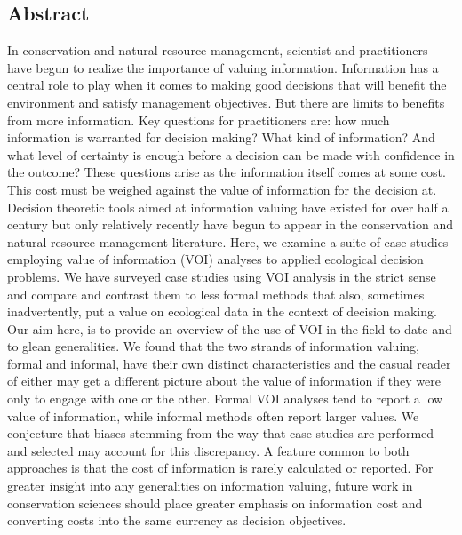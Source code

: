 
\subsection*{Abstract}\label{abstract}

In conservation and natural resource management, scientist and practitioners have begun to realize the importance of valuing information. Information has a central role to play when it comes to making good decisions that will benefit the environment and satisfy management objectives. But there are limits to benefits from more information. Key questions for practitioners are: how much information is warranted for decision making? What kind of information? And what level of certainty is enough before a decision can be made with confidence in the outcome? These questions arise as the information itself comes at some cost. This cost must be weighed against the value of information for the decision at. Decision theoretic tools aimed at information valuing have existed for over half a century but only relatively recently have begun to appear in the conservation and natural resource management literature. Here, we examine a suite of case studies employing value of information (VOI) analyses to applied ecological decision problems. We have surveyed case studies using VOI analysis in the strict sense and compare and contrast them to less formal methods that also, sometimes inadvertently, put a value on ecological data in the context of decision making. Our aim here, is to provide an overview of the use of VOI in the field to date and to glean generalities. We found that the two strands of information valuing, formal and informal, have their own distinct characteristics and the casual reader of either may get a different picture about the value of information if they were only to engage with one or the other. Formal VOI analyses tend to report a low value of information, while informal methods often report larger values. We conjecture that biases stemming from the way that case studies are performed and selected may account for this discrepancy. A feature common to both approaches is that the cost of information is rarely calculated or reported. For greater insight into any generalities on information valuing, future work in conservation sciences should place greater emphasis on information cost and converting costs into the same currency as decision objectives.